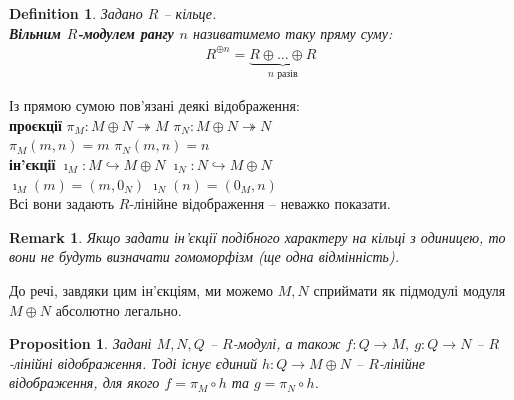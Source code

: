 \documentclass[a4paper, 10pt]{article}
\theoremstyle{theoremdd}
\theoremstyle{theoremdd}
\newtheorem{definition}[theorem]{Definition}
\theoremstyle{theoremdd}
\theoremstyle{theoremdd}
\theoremstyle{theoremdd}
\theoremstyle{theoremdd}
\theoremstyle{theoremdd}
\theoremstyle{theoremdd}
\theoremstyle{theoremdd}
\newtheorem{proposition}[theorem]{Proposition}
\theoremstyle{theoremdd}
\theoremstyle{theoremdd}
\newtheorem{remark}[theorem]{Remark}
\theoremstyle{theoremdd}
\theoremstyle{theoremdd}
\theoremstyle{theoremdd}
\theoremstyle{theoremdd}
\begin{document}
\begin{definition}
Задано $R$ -- кільце.\\
\textbf{Вільним $R$-модулем рангу $n$} називатимемо таку пряму суму:
\begin{align*}
R^{\oplus n} = \underbrace{R \oplus \dots \oplus R}_{n\text{ разів}}
\end{align*}
\end{definition}

Із прямою сумою пов'язані деякі відображення:\\
\textbf{проєкції} \qquad $\pi_M \colon M \oplus N \twoheadrightarrow M$ \qquad $\pi_N \colon M \oplus N \twoheadrightarrow N$\\
 \qquad $\pi_M(m,n) = m$ \qquad\qquad $\pi_N(m,n) = n$
\bigskip \\
\textbf{ін'єкції} \qquad $\imath_M \colon M \hookrightarrow M \oplus N$ \qquad $\imath_N \colon N \hookrightarrow M \oplus N$\\
 \qquad $\imath_M(m) = (m,0_N)$ \qquad\qquad $\imath_N(n) = (0_M,n)$\\
Всі вони задають $R$-лінійне відображення -- неважко показати.

\begin{remark}
Якщо задати ін'єкції подібного характеру на кільці з одиницею, то вони не будуть визначати гомоморфізм (ще одна відмінність).
\end{remark}

До речі, завдяки цим ін'єкціям, ми можемо $M,N$ сприймати як підмодулі модуля $M \oplus N$ абсолютно легально.

\begin{proposition}
Задані $M,N,Q$ -- $R$-модулі, а також $f \colon Q \to M,\ g \colon Q \to N$ -- $R$-лінійні відображення. Тоді існує єдиний $h \colon Q \to M \oplus N$ -- $R$-лінійне відображення, для якого $f = \pi_M \circ h$ та $g = \pi_N \circ h$.
\begin{figure}[H]
\centering
{}
\end{figure}
\end{proposition}
\end{document}

